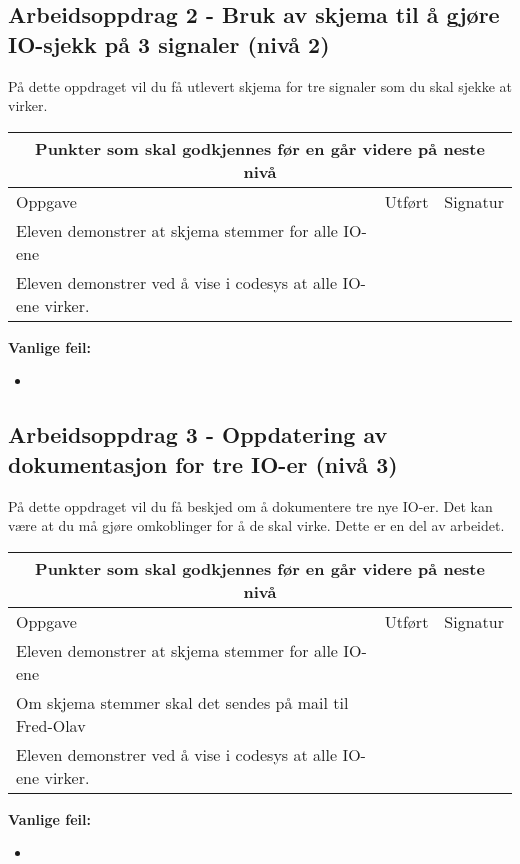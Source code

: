 \subsection*{Arbeidsoppdrag 2 - Bruk av skjema til å gjøre IO-sjekk på 3 signaler (nivå 2)}

På dette oppdraget vil du få utlevert skjema for tre signaler som du skal sjekke at virker. 

\begin{center}
\begin{tabular}{ | m{12cm} | m{1cm}| m{2cm} | } 
\hline
\multicolumn{3}{|c|}{Punkter som skal godkjennes før en går videre på neste nivå} \\
	\hline
	Oppgave	& Utført & Signatur \\ 
	\hline
Eleven demonstrer at skjema stemmer for alle IO-ene& & \\ 
	\hline
Eleven demonstrer ved å vise i codesys at alle IO-ene virker. & & \\ 
	\hline
\end{tabular}
\end{center}
\textbf{Vanlige feil:}
\begin{itemize}[noitemsep]
	\item 
\end{itemize}
\newpage
\subsection*{Arbeidsoppdrag 3 - Oppdatering av dokumentasjon for tre IO-er (nivå 3)}

På dette oppdraget vil du få beskjed om å dokumentere tre nye IO-er. Det kan være at du må gjøre omkoblinger for å de skal virke. Dette er en del av arbeidet. 
\begin{center}
\begin{tabular}{ | m{8cm} | m{1cm}| m{2cm} | } 
\hline
\multicolumn{3}{|c|}{Punkter som skal godkjennes før en går videre på neste nivå} \\
	\hline
	Oppgave	& Utført & Signatur \\ 
	\hline
Eleven demonstrer at skjema stemmer for alle IO-ene& & \\ 
	\hline
Om skjema stemmer skal det sendes på mail til Fred-Olav & & \\ 
	\hline
Eleven demonstrer ved å vise i codesys at alle IO-ene virker. & & \\ 
	\hline
\end{tabular}
\end{center}
\textbf{Vanlige feil:}
\begin{itemize}[noitemsep]
	\item 
\end{itemize}
\newpage

